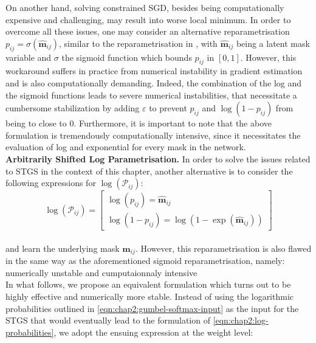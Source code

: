 On another hand, solving constrained SGD, besides being computationally
expensive and challenging, may result into worse local minimum. In order to
overcome all these issues, one may consider an alternative reparametrisation
$p_{ij}=\sigma(\bm{\hat{m}}_{ij})$, similar to the reparametrisation in
\cite{DBLP:conf/nips/ZhouLLY19}, with $\bm{\hat{m}}_{ij}$ being a latent mask
variable and $\sigma$ the sigmoid function which bounds $p_{ij}$ in $[0,1]$.
However, this workaround suffers in practice from numerical instability in
gradient estimation and is also computationally demanding. Indeed, the
combination of the log and the sigmoid functions leads to severe numerical
instabilities, that necessitate a cumbersome stabilization by adding
$\varepsilon$ to prevent $p_{ij}$ and $\log(1-p_{ij})$ from being to close to 0.
Furthermore, it is important to note that the above formulation is tremendously
computationally intensive, since it necessitates the evaluation of log and
exponential for every mask in the network.\\


\noindent\textbf{Arbitrarily Shifted Log Parametrisation.} In order to solve the
issues related to \ac{STGS} in the context of this chapter, another alternative
is to consider the following expressions for $\log(\mathcal{P}_{ij})$:\\

\begin{equation}
  \label{eqn:chap2:log-probabilities}
  \log(\mathcal{P}_{ij}) =
  \begin{bmatrix}
      \log(p_{ij}) = \bm{\hat{m}}_{ij} \\
      \log(1-p_{ij}) = \log(1-\exp(\bm{\hat{m}}_{ij}))
  \end{bmatrix} 
\end{equation}\\

\noindent and learn the underlying mask $\bm{\hat{m}}_{ij}$. However, this
reparametrisation is also flawed in the same way as the aforementioned sigmoid
reparametrisation, namely: numerically unstable and cumputaionnaly intensive\\

In what follows, we propose an equivalent formulation which turns out to be
highly effective and numerically more stable.  Instead of using the logarithmic
probabilities outlined in \cref{eqn:chap2:gumbel-softmax-input} as the input for
the \ac{STGS} that would eventually lead to the formulation of
\cref{eqn:chap2:log-probabilities}, we adopt the ensuing expression at the
weight level:\\

